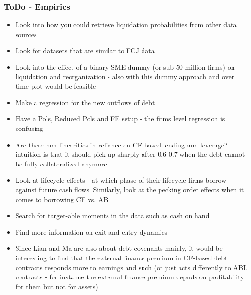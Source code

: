 \documentclass[12pt]{article}
\begin{document}
\subsubsection*{ToDo - Empirics}
\begin{itemize}\setlength\itemsep{0em} \small
    \item Look into how you could retrieve liquidation probabilities from other data sources \checkmark
    \item Look for datasets that are similar to FCJ data
    \item Look into the effect of a binary SME dummy (or sub-50 million firms) on liquidation and reorganization - also with this dummy approach and over time plot would be feasible \checkmark
    \item Make a regression for the new outflows of debt
    \item Have a Pols, Reduced Pols and FE  setup - the firms level regression is confusing
    \item Are there non-linearities in reliance on CF based lending and leverage? - intuition is that it should pick up sharply after 0.6-0.7 when the debt cannot be fully collateralized anymore
    \item Look at lifecycle effects - at which phase of their lifecycle firms borrow against future cash flows. Similarly, look at the pecking order effects when it comes to borrowing CF vs. AB
    \item Search for target-able moments in the data such as cash on hand
    \item Find more information on exit and entry dynamics
    \item Since Lian and Ma are also about debt covenants mainly, it would be interesting to find that the external finance premium in CF-based debt contracts  responds more to earnings and such (or just acts differently to ABL contracts - for instance the external finance premium depnds on profitability for them but not for assets)
\end{itemize} \normalsize
\end{document}
